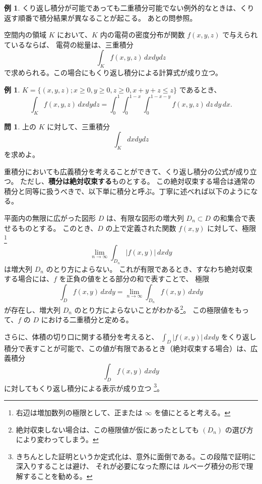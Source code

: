 \documentclass[a4paper]{jsarticle}
\theoremstyle{definition}
\newtheorem{Example}[Theorem]{例}
\newtheorem{Exercise}{問}%
\theoremstyle{remark}
\begin{document}
\begin{Example}
  くり返し積分が可能であっても二重積分可能でない例外的なときは、くり返す順番で積分結果が異なることが起こる。
  あとの問参照。
\end{Example}

空間内の領域 $K$ において、$K$ 内の電荷の密度分布が関数 $f(x,y,z)$ で与えられているならば、
電荷の総量は、三重積分
\[
\int_K f(x,y,z)\, dxdydz 
\]
で求められる。この場合にもくり返し積分による計算式が成り立つ。

\begin{Example}
$K = \{ (x,y,z); x \geq 0, y \geq 0, z \geq 0, x+y+z \leq z \}$ であるとき、
\[
\int_K f(x,y,z)\, dxdydz 
= \int_0^1 \int_0^{1-x} \int_0^{1-x-y} f(x,y,z)\, dz\, dy\, dx.  
\]
\end{Example}

\begin{Exercise}
上の $K$ に対して、三重積分
\[
\int_K dxdydz 
\]
を求めよ。
\end{Exercise}

重積分においても広義積分を考えることができて、くり返し積分の公式が成り立つ。
ただし、\textbf{積分は絶対収束する}ものとする。
この絶対収束する場合は通常の積分と同等に扱うべきで、以下単に積分と呼ぶ。丁寧に述べれば以下のようになる。

平面内の無限に広がった図形 $D$ は、有限な図形の増大列 $D_n \subset D$ の和集合で表せるものとする。
このとき、$D$ の上で定義された関数 $f(x,y)$ に対して、極限
\footnote{右辺は増加数列の極限として、正または $\infty$ を値にとると考える。}
\[
\lim_{n \to \infty} \int_{D_n} |f(x,y)|\,dxdy
\]
は増大列 $D_n$ のとり方によらない。
これが有限であるとき、すなわち絶対収束する場合には、$f$ を正負の値をとる部分の和で表すことで、
極限
\[
\int_D f(x,y)\,dxdy = \lim_{n \to \infty} \int_{D_n} f(x,y)\,dxdy
\]
が存在し、増大列 $D_n$ のとり方によらないことがわかる\footnote{絶対収束しない場合は、この極限値が仮にあったとしても $(D_n)$ の選び方により変わってしまう。}。
この極限値をもって、$f$ の $D$ における二重積分と定める。

さらに、体積の切り口に関する積分を考えると、
$\displaystyle \int_D |f(x,y)|\,dxdy$ 
をくり返し積分で表すことが可能で、この値が有限であるとき（絶対収束する場合）は、広義積分
\[
\int_D f(x,y)\, dxdy 
\]
に対してもくり返し積分による表示が成り立つ
\footnote{きちんとした証明というか定式化は、意外に面倒である。この段階で証明に深入りすることは避け、
それが必要になった際には ルベーグ積分の形で理解することを勧める。}。
\end{document}

